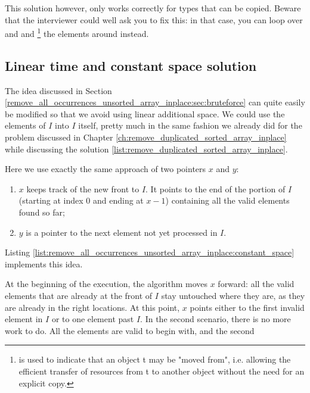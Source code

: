 This solution however, only works correctly for types that can be copied. Beware that the interviewer could
well ask you to fix this: in that case, you can loop over 
 and 
 and
\href{https://en.cppreference.com/w/cpp/utility/move}{
}\footnote{
 is used to indicate that an object t may be "moved from", i.e. allowing the efficient transfer of resources from t to another object without the need for an explicit copy.}
 the elements around instead.



\subsection{Linear time and constant space solution}
\label{remove_all_occurrences_unsorted_array_inplace:sec:constant_space}

The idea discussed in Section \ref{remove_all_occurrences_unsorted_array_inplace:sec:bruteforce} can quite easily be modified so that we avoid using linear
additional space. We could use  the elements of $I$ into $I$ itself, pretty much in the same fashion we already did for the problem discussed in Chapter \ref{ch:remove_duplicated_sorted_array_inplace}
while discussing the solution \ref{list:remove_duplicated_sorted_array_inplace}. 

Here we use exactly the same approach of two pointers $x$ and $y$:
\begin{enumerate}
	\item  $x$ keeps track of the new front to $I$. It points to the end of the portion of $I$ (starting at index $0$ and ending at $x-1$) containing all the valid elements found so far;
	\item $y$ is a pointer to the next element not yet processed in $I$.
\end{enumerate}

Listing \ref{list:remove_all_occurrences_unsorted_array_inplace:constant_space} implements this idea.





At the beginning of the execution, the algorithm moves $x$ forward: all the valid elements that are already
at the front of $I$ stay untouched where they are, as they are already in the right locations.
At this point, $x$ points either to the first invalid element in $I$ or to one element past $I$.
In the second scenario, there is no more work to do. All the elements are valid to begin with, and the second 

